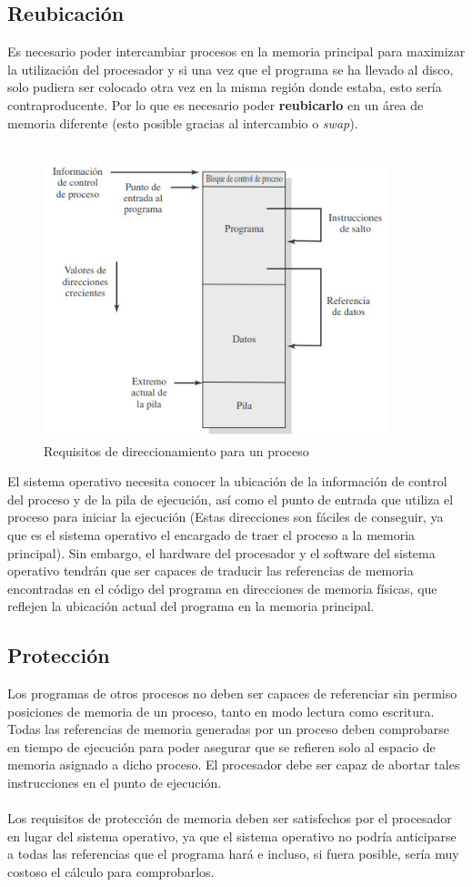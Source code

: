 \documentclass[12pt,a4paper]{article}
\begin{document}
\subsection{Reubicación}
Es necesario poder intercambiar procesos en la memoria principal para maximizar la utilización del procesador y si una vez que el programa se ha llevado al disco, solo pudiera ser colocado otra vez en la misma región donde estaba, esto sería contraproducente. Por lo que es necesario poder \textbf{reubicarlo} en un área de memoria diferente (esto posible gracias al intercambio o \textit{swap}).\\\\ 
\begin{figure}[H]
    \centering
    \includegraphics[width=10cm]{proceso1.jpeg}\par
    \caption{Requisitos de direccionamiento para un proceso}
\end{figure}
El sistema operativo necesita conocer la ubicación de la información de control del proceso y de la pila de ejecución, así como el punto de entrada que utiliza el proceso para iniciar la ejecución (Estas direcciones son fáciles de conseguir, ya que es el sistema operativo el encargado de traer el proceso a la memoria principal). Sin embargo, el hardware del procesador y el software del sistema operativo tendrán que ser capaces de traducir las referencias de memoria encontradas en el código del programa en direcciones de memoria físicas, que reflejen la ubicación actual del programa en la memoria principal.
\subsection{Protección}
Los programas de otros procesos no deben ser capaces de referenciar sin permiso posiciones de memoria de un proceso, tanto en modo lectura como escritura. Todas las referencias de memoria generadas por un proceso deben comprobarse en tiempo de ejecución para poder asegurar que se refieren solo al espacio de memoria asignado a dicho proceso. El procesador debe ser capaz de abortar tales instrucciones en el punto de ejecución.\\\\
Los requisitos de protección de memoria deben ser satisfechos por el procesador en lugar del sistema operativo, ya que el sistema operativo no podría anticiparse a todas las referencias que el programa hará e incluso, si fuera posible, sería muy costoso el cálculo para comprobarlos.
\end{document}
